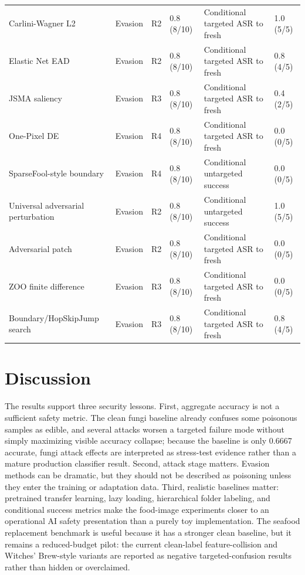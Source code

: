 \documentclass[conference]{IEEEtran}
\begin{document}
\begin{table}[t]
\begin{tabular}{p{}p{}p{}p{}p{}p{}}
Carlini-Wagner L2 & Evasion & R2 & 0.8 (8/10) & Conditional targeted ASR to fresh & 1.0 (5/5) \\
Elastic Net EAD & Evasion & R2 & 0.8 (8/10) & Conditional targeted ASR to fresh & 0.8 (4/5) \\
JSMA saliency & Evasion & R3 & 0.8 (8/10) & Conditional targeted ASR to fresh & 0.4 (2/5) \\
One-Pixel DE & Evasion & R4 & 0.8 (8/10) & Conditional targeted ASR to fresh & 0.0 (0/5) \\
SparseFool-style boundary & Evasion & R4 & 0.8 (8/10) & Conditional untargeted success & 0.0 (0/5) \\
Universal adversarial perturbation & Evasion & R2 & 0.8 (8/10) & Conditional untargeted success & 1.0 (5/5) \\
Adversarial patch & Evasion & R2 & 0.8 (8/10) & Conditional targeted ASR to fresh & 0.0 (0/5) \\
ZOO finite difference & Evasion & R3 & 0.8 (8/10) & Conditional targeted ASR to fresh & 0.0 (0/5) \\
Boundary/HopSkipJump search & Evasion & R3 & 0.8 (8/10) & Conditional targeted ASR to fresh & 0.8 (4/5) \\
\bottomrule
\end{tabular}
\end{table}
\section{Discussion}

The results support three security lessons. First, aggregate accuracy is not a sufficient safety metric. The clean fungi baseline already confuses some poisonous samples as edible, and several attacks worsen a targeted failure mode without simply maximizing visible accuracy collapse; because the baseline is only 0.6667 accurate, fungi attack effects are interpreted as stress-test evidence rather than a mature production classifier result. Second, attack stage matters. Evasion methods can be dramatic, but they should not be described as poisoning unless they enter the training or adaptation data. Third, realistic baselines matter: pretrained transfer learning, lazy loading, hierarchical folder labeling, and conditional success metrics make the food-image experiments closer to an operational AI safety presentation than a purely toy implementation. The seafood replacement benchmark is useful because it has a stronger clean baseline, but it remains a reduced-budget pilot: the current clean-label feature-collision and Witches' Brew-style variants are reported as negative targeted-confusion results rather than hidden or overclaimed.
\end{document}
